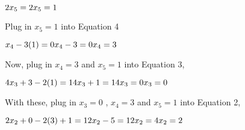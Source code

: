 \documentclass{article}
\begin{document}
    \begin{math}
         2x_5 = 2 
         \newline %
         x_5 = 1 
         \newline
    \end{math} \newline

\raggedright Plug in \begin{math} x_5 = 1 \end{math} into Equation 4 \newline

    \begin{math}
         x_4 - 3(1) = 0  
         \newline 
         x_4 - 3 = 0
         \newline
         x_4 = 3
    \end{math} \newline

\raggedright Now, plug in \begin{math} x_4 = 3 \end{math} and \begin{math} x_5 = 1 \end{math}  into Equation 3, \newline
    
    \begin{math}
        4x_3 + 3 - 2(1) = 1 \newline
        4x_3 + 1  = 1 \newline
        4x_3 = 0 \newline
        x_3 = 0 \newline  
    \end{math}

\raggedright With these, plug in \begin{math} x_3 = 0 \end{math} , \begin{math} x_4 = 3 \end{math} and \begin{math} x_5 = 1 \end{math} into Equation 2, \newline

    \begin{math}
        2x_2 + 0 - 2(3) + 1 = 1 \newline
        2x_2 - 5 = 1 \newline
        2x_2 = 4 \newline
        x_2 = 2 \newline
    \end{math}
\end{document}

